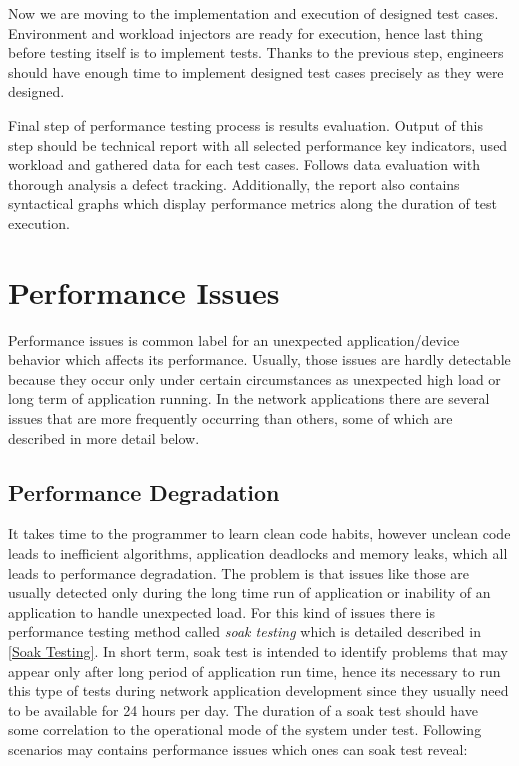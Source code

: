 Now we are moving to the implementation and execution of designed test cases. Environment and workload injectors are ready for execution, hence last thing before testing itself is to implement tests. Thanks to the previous step, engineers should have enough time to implement designed test cases precisely as they were designed. 

Final step of performance testing process is results evaluation. Output of this step should be technical report with all selected performance key indicators, used workload and gathered data for each test cases. Follows data evaluation with thorough analysis a defect tracking. Additionally, the report also contains syntactical graphs which display performance metrics along the duration of test execution.

\section{Performance Issues}
\label{Performance Issues}
Performance issues is common label for an unexpected application/device behavior which affects its performance. Usually, those issues are hardly detectable because they occur only under certain circumstances as unexpected high load or long term of application running. In the network applications there are several issues that are more frequently occurring  than others, some of which are described in more detail below.

\subsection{Performance Degradation}
It takes time to the programmer to learn clean code habits, however unclean code leads to inefficient algorithms, application deadlocks and memory leaks, which all leads to performance degradation. The problem is that issues like those are usually detected only during the long time run of application or inability of an application to handle unexpected load. For this kind of issues there is performance testing method called \emph{soak testing} \cite{BUCH:4TYPES, Manzor:APTB} which is detailed described in \ref{Soak Testing}. In short term, soak test is intended to identify problems that may appear only after long period of application run time, hence its necessary to run this type of tests during network application development since they usually need to be available for 24 hours per day. The duration of a soak test should have some correlation to the operational mode of the system under test. Following scenarios may contains performance issues which ones can soak test reveal:

